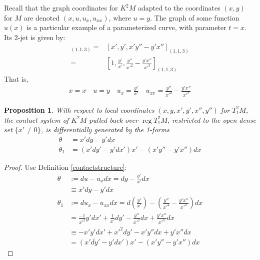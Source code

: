 \documentclass[12pt]{article}
\numberwithin{equation}{section}
\theoremstyle{plain}
\newtheorem{proposition}[definition]{Proposition}
\theoremstyle{definition}
\begin{document}
Recall that the graph coordinates for $K^{2}M$ adapted to the coordinates $(x,y)$ for $M$ are denoted $(x,u,u_{x},u_{xx})$, where $u=y$. The graph of some function $u(x)$ is a particular example of a parameterized curve, with parameter $t=x$. Its 2-jet is given by:
\begin{align*}
[1,u_{x},1\cdot u_{xx} - u_{x}\cdot 0]_{(1,1,3)}=&[x',y',x'y''-y'x'']_{(1,1,3)}\\
=&[1,\frac{y'}{x'},\frac{y''}{x'^{2}}-\frac{y'x''}{x'^3}]_{(1,1,3)}
\end{align*}
That is,
\begin{align*}
x=x\quad u=y \quad u_{x}=\frac{y'}{x'} \quad u_{xx}=\frac{y''}{x'^{2}}-\frac{y'x''}{x'^3}
\end{align*}
\begin{proposition} With respect to local coordinates $(x,y,x',y',x'',y'')$ for $T^{2}_{1}M$, the contact system of $K^{2}M$ pulled back over $\operatorname{reg}T^{2}_{1}M$, restricted to the open dense set $\{x'\neq 0\}$, is differentially generated by the 1-forms
\begin{align*}
\theta&=x'dy-y'dx\\
\theta_{1}&=(x'dy'-y'dx') x'-(x'y''-y'x'')dx
\end{align*}
\end{proposition}
\begin{proof}
Use Definition \ref{contactstructure}:
\begin{align*}
\theta&:=du-u_{x}dx=dy-\frac{y'}{x'}dx\\
&\equiv x' dy - y' dx\\
\theta_{1}&:=du_{x}-u_{xx}dx=d\left(\frac{y'}{x'}\right)-\left( \frac{y''}{x'^{2}}-\frac{y'x''}{x'^3} \right)dx\\
&=\frac{-1}{x'^{2}}y'dx'+\frac{1}{x'}dy'- \frac{y''}{x'^{2}}dx+\frac{y'x''}{x'^3}dx\\
&\equiv -x'y'dx' + x'^{2}dy' - x'y'' dx + y'x''dx\\
&=(x'dy'-y'dx') x'-(x'y''-y'x'')dx
\end{align*}
\end{proof}
\end{document}
